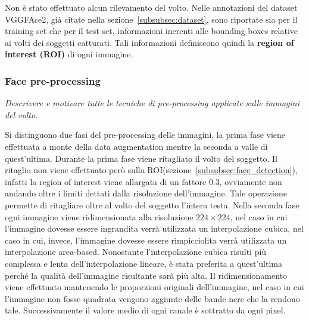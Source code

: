 Non è stato effettuato alcun rilevamento del volto. Nelle annotazioni del dataset VGGFAce2, già citate nella sezione~\ref{subsubsec:dataset}, sono riportate sia per il training set che per il test set, informazioni inerenti alle bounding boxes relative ai volti dei soggetti catturati. Tali informazioni definiscono quindi la \textbf{region of interest (\textbf{ROI})} di ogni immagine.

\subsubsection{Face pre-processing} 

\emph{Descrivere e motivare tutte le tecniche di pre-processing applicate sulle immagini del volto.}

Si distinguono due fasi del pre-processing delle immagini, la prima fase viene effettuata a monte della data augmentation mentre la seconda a valle di quest'ultima.
Durante la prima fase viene ritagliato il volto del soggetto. Il ritaglio non viene effettuato però sulla ROI(sezione~\ref{subsubsec:face_detection}), infatti la region of interest viene allargata di un fattore $0.3$, ovviamente non andando oltre i limiti dettati dalla risoluzione dell'immagine. Tale operazione permette di ritagliare oltre al volto del soggetto l'intera testa.
Nella seconda fase ogni immagine viene ridimensionata alla risoluzione $224 \times 224$, nel caso in cui l'immagine dovesse essere ingrandita verrà utilizzata un interpolazione cubica, nel caso in cui, invece, l'immagine dovesse essere rimpicciolita verrà utilizzata un interpolazione area-based. Nonostante l'interpolazione cubica risulti più complessa e lenta dell'interpolazione lineare, è stata preferita a quest'ultima perché la qualità dell'immagine risultante sarà più alta. Il ridimensionamento viene effettuato mantenendo le proporzioni originali dell'immagine, nel caso in cui l'immagine non fosse quadrata vengono aggiunte delle bande nere che la rendono tale. Successivamente il valore medio di ogni canale è sottratto da ogni pixel.

